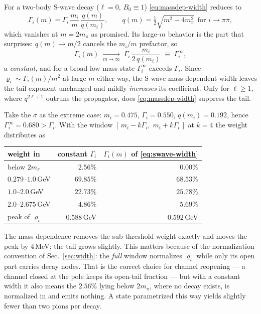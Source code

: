 \documentclass[11pt]{article}
\begin{document}
For a two-body S-wave decay ($\ell=0$, $B_0\equiv1$)
\eqref{eq:massdep-width} reduces to
\begin{equation}
\Gamma_i(m)=\Gamma_i\,\frac{m_i}{m}\,\frac{q(m)}{q(m_i)},
\qquad
q(m)=\tfrac12\sqrt{m^{2}-4m_\pi^{2}}\ \ \text{for }i\to\pi\pi ,
\label{eq:swave-width}
\end{equation}
which vanishes at $m=2m_\pi$ as promised.  Its large-$m$ behavior is the
part that surprises: $q(m)\to m/2$ cancels the $m_i/m$ prefactor, so
\begin{equation}
\Gamma_i(m)\;\xrightarrow[m\to\infty]{}\;\Gamma_i\,\frac{m_i}{2\,q(m_i)}
\;\equiv\;\Gamma_i^{\infty},
\label{eq:swave-asymptote}
\end{equation}
a \emph{constant}, and for a broad low-mass state $\Gamma_i^{\infty}$
exceeds $\Gamma_i$.  Since $\varrho_i\sim\Gamma_i(m)/m^{2}$ at large $m$
either way, the S-wave mass-dependent width leaves the tail exponent
unchanged and mildly \emph{increases} its coefficient.  Only for $\ell\ge1$,
where $q^{2\ell+1}$ outruns the propagator, does \eqref{eq:massdep-width}
suppress the tail.

Take the $\sigma$ as the extreme case: $m_i=0.475$, $\Gamma_i=0.550$,
$q(m_i)=0.192$, hence $\Gamma_i^{\infty}=0.680>\Gamma_i$.  With the window
$[\,m_i-k\Gamma_i,\;m_i+k\Gamma_i\,]$ at $k=4$ the weight distributes as

\begin{center}
\begin{tabular}{lrr}
\hline
weight in & constant $\Gamma_i$ & $\Gamma_i(m)$ of \eqref{eq:swave-width}\\
\hline
below $2m_\pi$        & $2.56\%$  & $0.00\%$\\
$0.279$--$1.0$\,GeV   & $69.85\%$ & $68.53\%$\\
$1.0$--$2.0$\,GeV     & $22.73\%$ & $25.78\%$\\
$2.0$--$2.675$\,GeV   & $4.86\%$  & $5.69\%$\\
\hline
peak of $\varrho_i$   & $0.588$\,GeV & $0.592$\,GeV\\
\hline
\end{tabular}
\end{center}

\noindent
The mass dependence removes the sub-threshold weight exactly and moves the
peak by $4$\,MeV; the tail grows slightly.  This matters because of the
normalization convention of Sec.~\ref{sec:width}: the \emph{full} window
normalizes $\varrho_i$ while only its open part carries decay nodes.  That
is the correct choice for channel reopening --- a channel closed at the pole
keeps its open-tail fraction --- but with a constant width it also means the
$2.56\%$ lying below $2m_\pi$, where no decay exists, is normalized in and
emits nothing.  A state parametrized this way yields slightly fewer than two
pions per decay.
\end{document}
